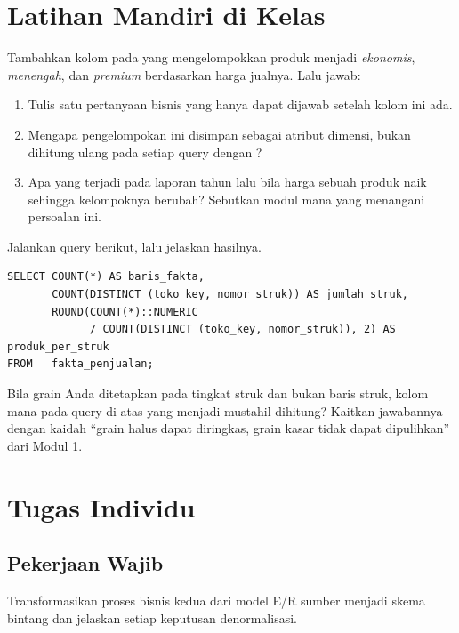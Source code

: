 \section{Latihan Mandiri di Kelas}


Tambahkan kolom  pada  yang
mengelompokkan produk menjadi \emph{ekonomis}, \emph{menengah}, dan
\emph{premium} berdasarkan harga jualnya. Lalu jawab:

\begin{enumerate}[leftmargin=1.4em]
  \item Tulis satu pertanyaan bisnis yang hanya dapat dijawab setelah kolom ini
        ada.
  \item Mengapa pengelompokan ini disimpan sebagai atribut dimensi, bukan
        dihitung ulang pada setiap query dengan ?
  \item Apa yang terjadi pada laporan tahun lalu bila harga sebuah produk naik
        sehingga kelompoknya berubah? Sebutkan modul mana yang menangani
        persoalan ini.
\end{enumerate}


Jalankan query berikut, lalu jelaskan hasilnya.

\begin{lstlisting}[style=sqlgaya]
SELECT COUNT(*) AS baris_fakta,
       COUNT(DISTINCT (toko_key, nomor_struk)) AS jumlah_struk,
       ROUND(COUNT(*)::NUMERIC
             / COUNT(DISTINCT (toko_key, nomor_struk)), 2) AS produk_per_struk
FROM   fakta_penjualan;
\end{lstlisting}

Bila grain Anda ditetapkan pada tingkat struk dan bukan baris struk, kolom mana
pada query di atas yang menjadi mustahil dihitung? Kaitkan jawabannya dengan
kaidah ``grain halus dapat diringkas, grain kasar tidak dapat dipulihkan'' dari
Modul 1.

\section{Tugas Individu}

\subsection{Pekerjaan Wajib}
Transformasikan proses bisnis kedua dari model E/R sumber menjadi skema bintang
dan jelaskan setiap keputusan denormalisasi.

